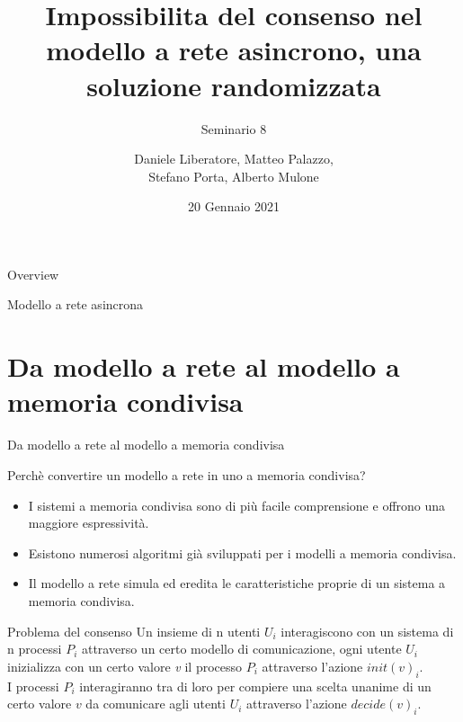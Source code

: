 \documentclass{beamer}
\title{Impossibilita del consenso nel modello a rete asincrono, una soluzione randomizzata}
\subtitle{Seminario 8}
\author{Daniele Liberatore, Matteo Palazzo, \\ Stefano Porta, Alberto Mulone}
\institute{Università degli Studi di Torino}
\date{20 Gennaio 2021}
\begin{document}
\frame{\titlepage}

\begin{frame}{Overview}
    \tableofcontents
\end{frame}


\begin{frame}{Modello a rete asincrona}

\end{frame}

\section{Da modello a rete al modello a memoria condivisa}

\begin{frame}{Da modello a rete al modello a memoria condivisa}
    \begin{block}{Perchè convertire un modello a rete in uno a memoria condivisa?}
        \begin{itemize}
            \item I sistemi a memoria condivisa sono di più facile comprensione e offrono una maggiore espressività.
            \item Esistono numerosi algoritmi già sviluppati per i modelli a memoria condivisa.
            \item Il modello a rete simula ed eredita le caratteristiche proprie di un sistema a memoria condivisa.
        \end{itemize}
    \end{block}
\end{frame}

\begin{frame}{Problema del consenso}
    Un insieme di n utenti $U_{i}$ interagiscono con un sistema di n processi $P_{i}$ attraverso un certo modello di comunicazione, ogni utente $U_{i}$ inizializza con un certo valore \textit{v} il processo $P_{i}$ attraverso l'azione $init(v)_{i}$.
    \\[10pt]
    I processi $P_{i}$ interagiranno tra di loro per compiere una scelta unanime di un certo valore $v$ da comunicare agli utenti $U_{i}$ attraverso l'azione $decide(v)_{i}$.
    
    \iffalse
    Ogni processo può essere soggetto ad un \textbf{stopping failure}, ovvero può smettere di funzionare senza nessun avviso. Questo può essere modellato attraverso delle azioni di input chiamate $stop_{i}$ le quali non fanno altro che disabilitare ogni azione localmente controllata del processo $P_{i}$. Una esecuzione è detta failure-free se non contiene eventi di $stop$
    \fi
\end{frame}
\end{document}
